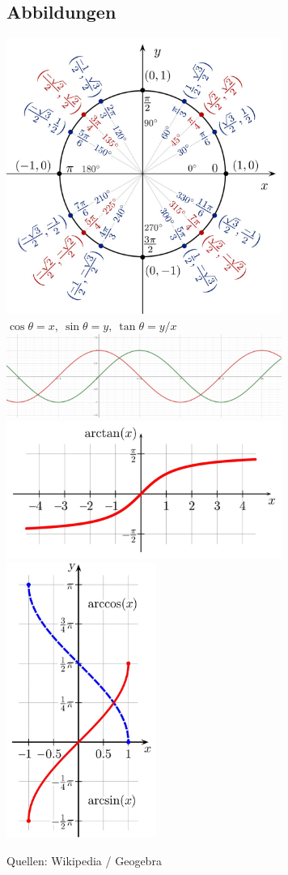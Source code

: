 \documentclass[8pt, a4paper, landscape, fleqn]{scrartcl}
\begin{document}
\begin{multicols*}{3}
		\section{Abbildungen}
		 \begin{center}
	        \includegraphics[width=9cm]{unit-circle.jpg}
	        $\cos\theta = x, \ \sin\theta = y, \ \tan\theta = y/x$
		    \includegraphics[width=9cm]{cos_sin.jpg}
		    \includegraphics[width=9cm]{arctan.jpg}
		    \includegraphics[height=9cm]{arcsin_arccos.jpg}
		 \end{center}
		 \tiny{Quellen: Wikipedia / Geogebra}
		 \normalsize
		 
    \end{multicols*} 
\end{document}
